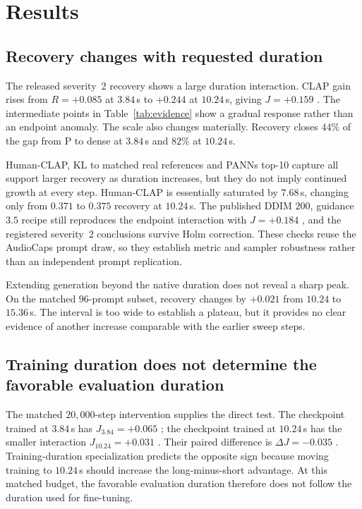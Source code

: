 \section{Results}
\subsection{Recovery changes with requested duration}
The released severity~2 recovery shows a large duration interaction. CLAP gain rises from $R=+0.085$  at $3.84$\,s to $+0.244$  at $10.24$\,s, giving $J=+0.159$ . The intermediate points in Table~\ref{tab:evidence} show a gradual response rather than an endpoint anomaly. The scale also changes materially. Recovery closes $44\%$ of the gap from P to dense at $3.84$\,s and $82\%$ at $10.24$\,s.

Human-CLAP, KL to matched real references and PANNs top-10 capture all support larger recovery as duration increases, but they do not imply continued growth at every step. Human-CLAP is essentially saturated by $7.68$\,s, changing only from $0.371$ to $0.375$ recovery at $10.24$\,s. The published DDIM $200$, guidance $3.5$ recipe still reproduces the endpoint interaction with $J=+0.184$ , and the registered severity~2 conclusions survive Holm correction. These checks reuse the AudioCaps prompt draw, so they establish metric and sampler robustness rather than an independent prompt replication.

Extending generation beyond the native duration does not reveal a sharp peak. On the matched $96$-prompt subset, recovery changes by $+0.021$  from $10.24$ to $15.36$\,s. The interval is too wide to establish a plateau, but it provides no clear evidence of another increase comparable with the earlier sweep steps.

\subsection{Training duration does not determine the favorable evaluation duration}
The matched $20{,}000$-step intervention supplies the direct test. The checkpoint trained at $3.84$\,s has $J_{3.84}=+0.065$ ; the checkpoint trained at $10.24$\,s has the smaller interaction $J_{10.24}=+0.031$ . Their paired difference is $\Delta J=-0.035$ . Training-duration specialization predicts the opposite sign because moving training to $10.24$\,s should increase the long-minus-short advantage. At this matched budget, the favorable evaluation duration therefore does not follow the duration used for fine-tuning.


